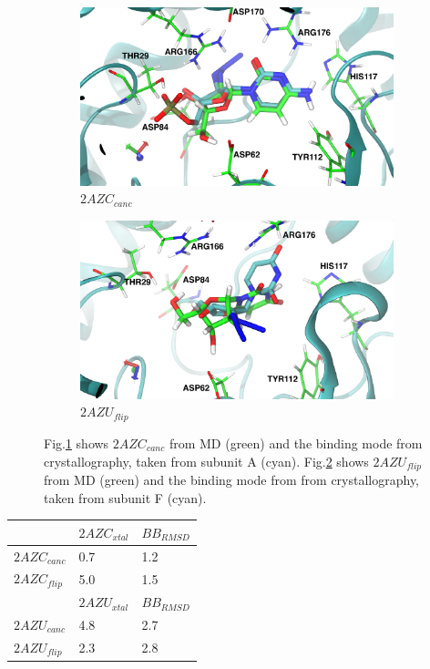 \begin{figure}[!ht]
\centering
\begin{subfigure}{.5\textwidth}
  \centering
  \includegraphics[width=.9\linewidth]{chapter4/xtal/2AZC_canc-xtal_front.pdf}
  \caption{$2AZC_{canc}$}
  \label{fig:2AZC-xtal}
\end{subfigure}%
\begin{subfigure}{.5\textwidth}
  \centering
  \includegraphics[width=.9\linewidth]{chapter4/xtal/2AZU_flip-xtal_front.pdf}
  \caption{$2AZU_{flip}$}
  \label{fig:2AZU-xtal}
\end{subfigure}
\caption{Fig.\ref{fig:2AZC-xtal} shows $2AZC_{canc}$ from MD (green) and the binding mode from crystallography, taken from subunit A (cyan). Fig.\ref{fig:2AZU-xtal} shows $2AZU_{flip}$ from MD (green) and the binding mode from from crystallography, taken from subunit F (cyan). }
\label{fig:xtal}
\end{figure}


\begin{table}[!ht]
\begin{tabular}{|l|l|l|}
\hline
                          & \textbf{$2AZC_{xtal}$} & \textbf{$BB_{RMSD}$} \\ \hline
\textbf{$2AZC_{canc}$} & 0.7                  & 1.2             \\ \hline
\textbf{$2AZC_{flip}$} & 5.0                  & 1.5              \\ \hline
\textbf{}                 & \textbf{$2AZU_{xtal}$} & \textbf{$BB_{RMSD}$} \\ \hline
\textbf{$2AZU_{canc}$} & 4.8                  & 2.7             \\ \hline
\textbf{$2AZU_{flip}$} & 2.3                  & 2.8              \\ \hline
\end{tabular}
\end{table}

